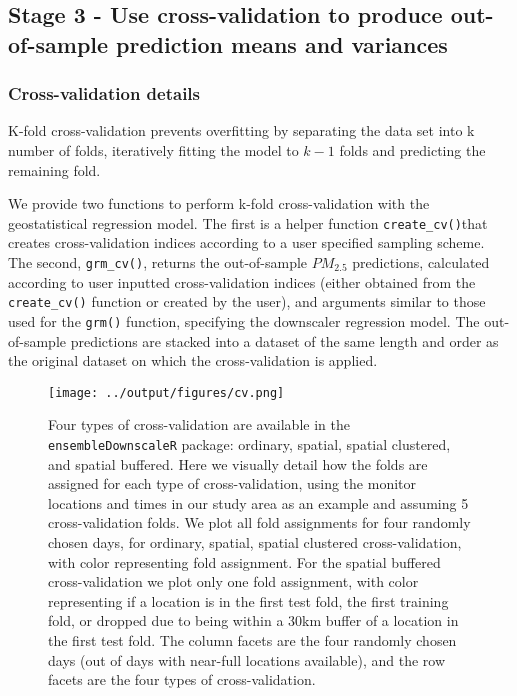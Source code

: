 \documentclass[12pt]{article}
\begin{document}
\subsection*{Stage 3 - Use cross-validation to produce out-of-sample prediction means and variances}

\subsubsection*{Cross-validation details}

K-fold cross-validation prevents overfitting by separating the data set into k number of folds, iteratively fitting the model to $k-1$ folds and predicting the remaining fold.

We provide two functions to perform k-fold cross-validation with the geostatistical regression model. 
The first is a helper function \texttt{create\_cv()}that creates cross-validation indices according to a user specified sampling scheme. 
The second, \texttt{grm\_cv()}, returns the out-of-sample $PM_{2.5}$ predictions, calculated according to user inputted cross-validation indices (either obtained from the \texttt{create\_cv()} function or created by the user), and arguments similar to those used for the \texttt{grm()} function, specifying the downscaler regression model. 
The out-of-sample predictions are stacked into a dataset of the same length and order as the original dataset on which the cross-validation is applied.

\begin{figure}[ht]
    \centering
    \texttt{[image: ../output/figures/cv.png]}
    \caption{Four types of cross-validation are available in the \texttt{ensembleDownscaleR} package: ordinary, spatial, spatial clustered, and spatial buffered.
    Here we visually detail how the folds are assigned for each type of cross-validation, using the monitor locations and times in our study area as an example and assuming 5 cross-validation folds. 
    We plot all fold assignments for four randomly chosen days, for ordinary, spatial, spatial clustered cross-validation, with color representing fold assignment.
    For the spatial buffered cross-validation we plot only one fold assignment, with color representing if a location is in the first test fold, the first training fold, or dropped due to being within a 30km buffer of a location in the first test fold.
    The column facets are the four randomly chosen days (out of days with near-full locations available), and the row facets are the four types of cross-validation.}
    \label{fig:cvtypes}
\end{figure}
\end{document}
